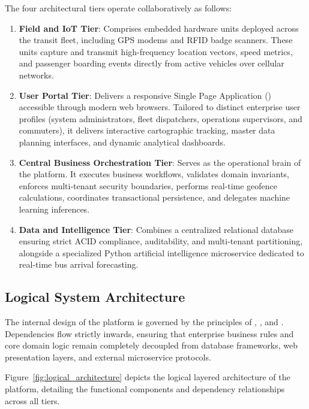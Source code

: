 The four architectural tiers operate collaboratively as follows:
\begin{enumerate}
  \item \textbf{Field and IoT Tier}: Comprises embedded hardware units deployed across the transit fleet, including GPS modems and RFID badge scanners. These units capture and transmit high-frequency location vectors, speed metrics, and passenger boarding events directly from active vehicles over cellular networks.
  \item \textbf{User Portal Tier}: Delivers a responsive Single Page Application () accessible through modern web browsers. Tailored to distinct enterprise user profiles (system administrators, fleet dispatchers, operations supervisors, and commuters), it delivers interactive cartographic tracking, master data planning interfaces, and dynamic analytical dashboards.
  \item \textbf{Central Business Orchestration Tier}: Serves as the operational brain of the platform. It executes business workflows, validates domain invariants, enforces multi-tenant security boundaries, performs real-time geofence calculations, coordinates transactional persistence, and delegates machine learning inferences.
  \item \textbf{Data and Intelligence Tier}: Combines a centralized relational database ensuring strict ACID compliance, auditability, and multi-tenant partitioning, alongside a specialized Python artificial intelligence microservice dedicated to real-time bus arrival forecasting.
\end{enumerate}

\subsection{Logical System Architecture}
\label{subsec:logical_architecture}
The internal design of the  platform is governed by the principles of , , and . Dependencies flow strictly inwards, ensuring that enterprise business rules and core domain logic remain completely decoupled from database frameworks, web presentation layers, and external microservice protocols.

Figure~\ref{fig:logical_architecture} depicts the logical layered architecture of the platform, detailing the functional components and dependency relationships across all tiers.

